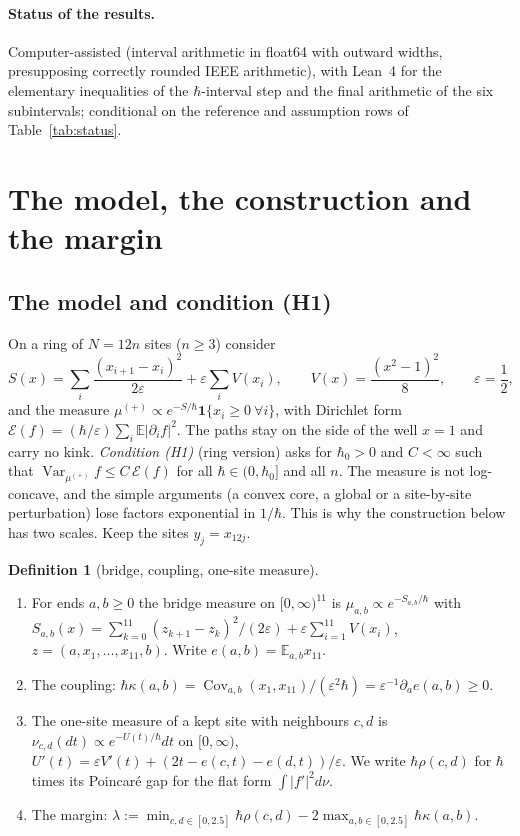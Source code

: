 \documentclass[11pt,a4paper]{article}
\theoremstyle{definition}
\newtheorem{definition}[theorem]{Definition}
\theoremstyle{remark}
\newcommand{\hk}{\hbar\kappa}
\newcommand{\hr}{\hbar\rho}
\newcommand{\E}{\mathbb{E}}
\DeclareMathOperator{\Cov}{Cov}
\DeclareMathOperator{\Var}{Var}
\begin{document}
\paragraph{Status of the results.} Computer-assisted (interval arithmetic in float64 with outward widths, presupposing correctly rounded IEEE arithmetic), with Lean~4 for the elementary inequalities of the $\hbar$-interval step and the final arithmetic of the six subintervals; conditional on the reference and assumption rows of Table~\ref{tab:status}.

\section{The model, the construction and the margin}\label{sec:model}

\subsection{The model and condition (H1)}

On a ring of $N=12n$ sites ($n\ge3$) consider
\[
S(x)=\sum_i\frac{(x_{i+1}-x_i)^2}{2\varepsilon}+\varepsilon\sum_iV(x_i),\qquad V(x)=\frac{(x^2-1)^2}{8},\qquad\varepsilon=\frac12,
\]
and the measure $\mu^{(+)}\propto e^{-S/\hbar}\mathbf 1\{x_i\ge0\ \forall i\}$, with Dirichlet form $\mathcal E(f)=(\hbar/\varepsilon)\sum_i\E|\partial_if|^2$. The paths stay on the side of the well $x=1$ and carry no kink. \emph{Condition (H1)} (ring version) asks for $\hbar_0>0$ and $C<\infty$ such that $\Var_{\mu^{(+)}}f\le C\,\mathcal E(f)$ for all $\hbar\in(0,\hbar_0]$ and all $n$. The measure is not log-concave, and the simple arguments (a convex core, a global or a site-by-site perturbation) lose factors exponential in $1/\hbar$. This is why the construction below has two scales. Keep the sites $y_j=x_{12j}$.

\begin{definition}[bridge, coupling, one-site measure]\label{def:margin}
\begin{enumerate}[label=(\roman*),leftmargin=2em]
\item For ends $a,b\ge0$ the bridge measure on $[0,\infty)^{11}$ is $\mu_{a,b}\propto e^{-S_{a,b}/\hbar}$ with $S_{a,b}(x)=\sum_{k=0}^{11}(z_{k+1}-z_k)^2/(2\varepsilon)+\varepsilon\sum_{i=1}^{11}V(x_i)$, $z=(a,x_1,\dots,x_{11},b)$. Write $e(a,b)=\E_{a,b}x_{11}$.
\item The coupling: $\hk(a,b)=\Cov_{a,b}(x_1,x_{11})/(\varepsilon^2\hbar)=\varepsilon^{-1}\partial_ae(a,b)\ge0$.
\item The one-site measure of a kept site with neighbours $c,d$ is $\nu_{c,d}(dt)\propto e^{-U(t)/\hbar}dt$ on $[0,\infty)$, $U'(t)=\varepsilon V'(t)+(2t-e(c,t)-e(d,t))/\varepsilon$. We write $\hr(c,d)$ for $\hbar$ times its Poincaré gap for the flat form $\int|f'|^2d\nu$.
\item The margin: $\lambda:=\min_{c,d\in[0,2.5]}\hr(c,d)-2\max_{a,b\in[0,2.5]}\hk(a,b)$.
\end{enumerate}
\end{definition}
\end{document}
